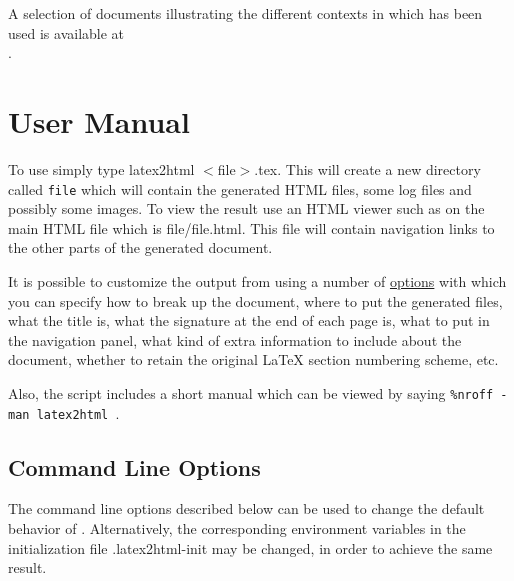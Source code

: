 A selection of documents illustrating the different contexts in 
which \latextohtml has been used is available at \\
.

\section{User Manual}
 \label{sec:man}

To use \latextohtml simply type {\fn latex2html $<$file$>$.tex}. This 
will create a new directory called {\tt file} which will contain 
the generated HTML files, some log files and possibly some images.
To view the result use an HTML viewer such as 
on the main HTML file which is {\fn file/file.html}. This file will
contain navigation links to the other parts of the generated document.

It is possible to customize the output from \latextohtml using a number
of \hyperref{command line options}{command line options (see Section
}{)}{options}
with which you can specify how to break up the document, where to put 
the generated files, what the title is, what the signature at the end
of each page is, what to put in the navigation panel, what kind of
extra information to include about the document, whether to retain
the original LaTeX section numbering scheme, etc.

Also, the \latextohtml script includes a short manual which can be 
viewed by saying 
{\tt \verb|%nroff -man latex2html| }.

\subsection{Command Line Options}
\label{options}
The command line options described below can be used to change the
default behavior of \latextohtml. Alternatively, the corresponding 
environment variables
in the initialization file {\fn .latex2html-init} may be changed, in
order to achieve the same result.

